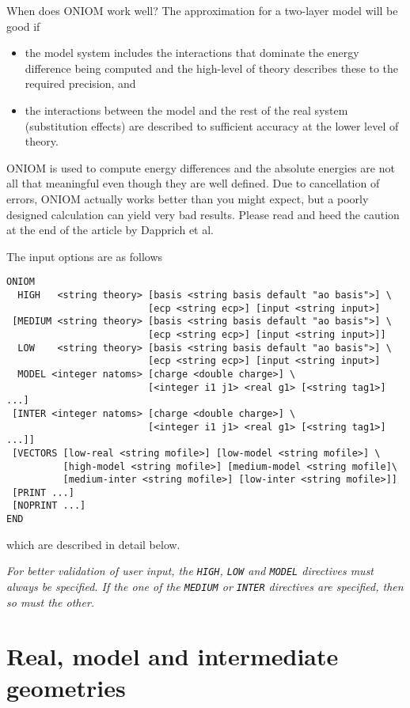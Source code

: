 When does ONIOM work well?  The approximation for a two-layer model
will be good if
\begin{itemize}
\item the model system includes the interactions that dominate the
   energy difference being computed and the high-level of theory
   describes these to the required precision, and
\item the interactions between the model and the rest of the real system
    (substitution effects) are described to sufficient accuracy at the
    lower level of theory.
\end{itemize}
ONIOM is used to compute energy differences and the absolute energies
are not all that meaningful even though they are well defined.  Due to
cancellation of errors, ONIOM actually works better than you might
expect, but a poorly designed calculation can yield very bad results.
Please read and heed the caution at the end of the article by Dapprich
et al.

The input options are as follows
\begin{verbatim}
ONIOM
  HIGH   <string theory> [basis <string basis default "ao basis">] \
                         [ecp <string ecp>] [input <string input>]
 [MEDIUM <string theory> [basis <string basis default "ao basis">] \
                         [ecp <string ecp>] [input <string input>]]
  LOW    <string theory> [basis <string basis default "ao basis">] \
                         [ecp <string ecp>] [input <string input>]
  MODEL <integer natoms> [charge <double charge>] \
                         [<integer i1 j1> <real g1> [<string tag1>] ...]
 [INTER <integer natoms> [charge <double charge>] \
                         [<integer i1 j1> <real g1> [<string tag1>] ...]]
 [VECTORS [low-real <string mofile>] [low-model <string mofile>] \
          [high-model <string mofile>] [medium-model <string mofile]\
          [medium-inter <string mofile>] [low-inter <string mofile>]]
 [PRINT ...]
 [NOPRINT ...]
END
\end{verbatim}
which are described in detail below.  

{\em  For better validation of user input, the \verb+HIGH+,
\verb+LOW+ and \verb+MODEL+ directives must always be specified.  If
the one of the \verb+MEDIUM+ or \verb+INTER+ directives are specified,
then so must the other.}

\section{Real, model and intermediate geometries}

